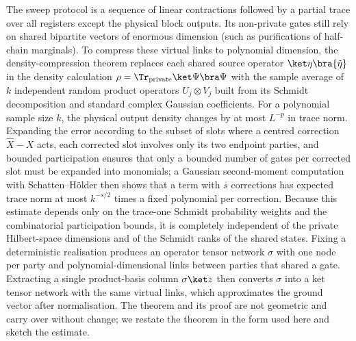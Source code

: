 \begin{inwords}
The sweep protocol is a sequence of linear contractions followed by a partial
trace over all registers except the physical block outputs. Its non-private
gates still rely on shared bipartite vectors of enormous dimension (such as
purifications of half-chain marginals). To compress these virtual links to
polynomial dimension, the density-compression theorem replaces each shared
source operator $\ket\eta\bra{\tilde\eta}$ in the density calculation
$\rho=\Tr_{\mathrm{private}}\ket\Psi\bra\Psi$ with the sample average of $k$
independent random product operators $U_j\otimes V_j$ built from its Schmidt
decomposition and standard complex Gaussian coefficients. For a polynomial
sample size $k$, the physical output density changes by at most $L^{-p}$ in
trace norm. Expanding the error according to the subset of slots where a
centred correction $\widehat X-X$ acts, each corrected slot involves only its
two endpoint parties, and bounded participation ensures that only a bounded
number of gates per corrected slot must be expanded into monomials; a
Gaussian second-moment computation with Schatten--Hölder then shows that a
term with $s$ corrections has expected trace norm at most $k^{-s/2}$ times a
fixed polynomial per correction. Because this estimate depends only on the
trace-one Schmidt probability weights and the combinatorial participation
bounds, it is completely independent of the private Hilbert-space dimensions
and of the Schmidt ranks of the shared states. Fixing a deterministic
realisation produces an operator tensor network $\sigma$ with one node per
party and polynomial-dimensional links between parties that shared a gate.
Extracting a single product-basis column $\sigma\ket z$ then converts
$\sigma$ into a ket tensor network with the same virtual links, which
approximates the ground vector after normalisation. The theorem and its
proof are not geometric and carry over without change; we restate the
theorem in the form used here and sketch the estimate.
\end{inwords}

